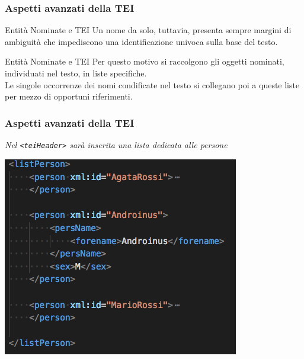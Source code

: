     \begin{frame}
        \frametitle{Aspetti avanzati della TEI}
        \addtocounter{nframe}{1}

        \begin{block}{Entità Nominate e TEI}
            Un nome da solo, tuttavia, presenta sempre margini di ambiguità che impediscono una identificazione univoca sulla base del testo.
        \end{block}

        \begin{block}{Entità Nominate e TEI}
            Per questo motivo si raccolgono gli oggetti nominati, individuati nel testo, in liste specifiche.
            \\ Le singole occorrenze dei nomi condificate nel testo si collegano poi a queste liste per mezzo di opportuni riferimenti. 
        \end{block}
        
    \end{frame}

    \begin{frame}
        \frametitle{Aspetti avanzati della TEI}
        \addtocounter{nframe}{1}
        
        \textit{Nel \texttt{<teiHeader>} sarà inserita una lista dedicata alle persone}

            \begin{center}
                \includegraphics[width=.7\textwidth]{imgs/listPerson.png}
            \end{center}
        
    \end{frame}

